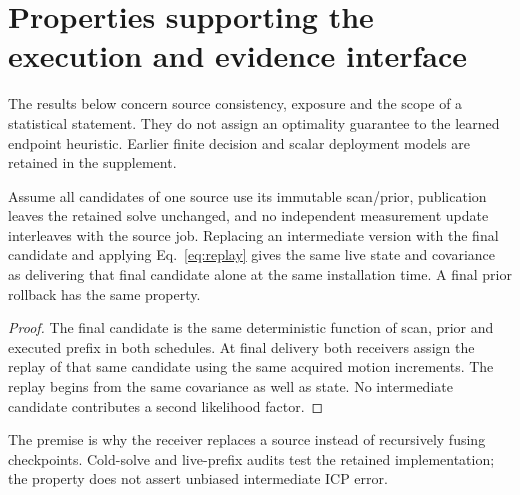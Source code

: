 \section{Properties supporting the execution and evidence interface}\label{sec:theory}
The results below concern source consistency, exposure and the scope of a statistical statement. They do not assign an optimality guarantee to the learned endpoint heuristic. Earlier finite decision and scalar deployment models are retained in the supplement.

\begin{proposition}\label{prop:version}
Assume all candidates of one source use its immutable scan/prior, publication leaves the retained solve unchanged, and no independent measurement update interleaves with the source job. Replacing an intermediate version with the final candidate and applying Eq.~\eqref{eq:replay} gives the same live state and covariance as delivering that final candidate alone at the same installation time. A final prior rollback has the same property.
\end{proposition}
\begin{proof}
The final candidate is the same deterministic function of scan, prior and executed prefix in both schedules. At final delivery both receivers assign the replay of that same candidate using the same acquired motion increments. The replay begins from the same covariance as well as state. No intermediate candidate contributes a second likelihood factor.
\end{proof}
The premise is why the receiver replaces a source instead of recursively fusing checkpoints. Cold-solve and live-prefix audits test the retained implementation; the property does not assert unbiased intermediate ICP error.

